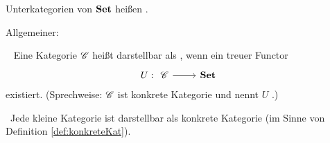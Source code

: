 \begin{bemerkung}
	Unterkategorien von $\operatorname{\mathbf{Set}}$ heißen .
\end{bemerkung}
Allgemeiner:
\begin{definition}\
	\label{def:konkreteKat}
	Eine Kategorie $\mathscr C$ heißt darstellbar als , wenn ein treuer Functor
	\begin{align*}
		U: \begin{tikzcd}[ampersand replacement=\&] \Cat \arrow[r]\& \Set \end{tikzcd}
	\end{align*}
	existiert. (Sprechweise: $\mathscr C$ ist konkrete Kategorie und nennt $U$ .)
\end{definition}
\begin{satz}\
	Jede kleine Kategorie ist darstellbar als konkrete Kategorie (im Sinne von Definition \ref{def:konkreteKat}).
\end{satz}
